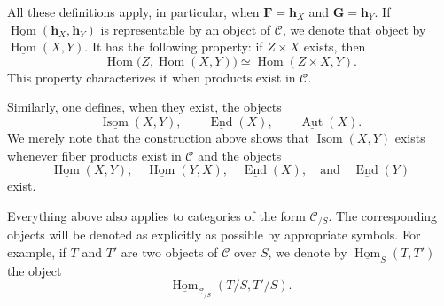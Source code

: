 All these definitions apply, in particular, when
\(\mathbf F=\mathbf h_X\) and \(\mathbf G=\mathbf h_Y\). If
\(\underline{\operatorname{Hom}}(\mathbf h_X,\mathbf h_Y)\) is
representable by an object of \(\mathscr C\), we denote that object by
\(\underline{\operatorname{Hom}}(X,Y)\). It has the following property:
if \(Z\times X\) exists, then
\[
  \operatorname{Hom}
    \bigl(Z,\underline{\operatorname{Hom}}(X,Y)\bigr)
    \simeq
  \operatorname{Hom}(Z\times X,Y).
\]
This property characterizes it when products exist in \(\mathscr C\).

Similarly, one defines, when they exist, the objects
\[
  \underline{\operatorname{Isom}}(X,Y),
  \qquad
  \underline{\operatorname{End}}(X),
  \qquad
  \underline{\operatorname{Aut}}(X).
\]
We merely note that the construction above shows that
\(\underline{\operatorname{Isom}}(X,Y)\) exists whenever fiber products
exist in \(\mathscr C\) and the objects
\[
  \underline{\operatorname{Hom}}(X,Y),
  \quad
  \underline{\operatorname{Hom}}(Y,X),
  \quad
  \underline{\operatorname{End}}(X),
  \quad\text{and}\quad
  \underline{\operatorname{End}}(Y)
\]
exist.

Everything above also applies to categories of the form \(\mathscr C_{/S}\).
The corresponding objects will be denoted as explicitly as possible by
appropriate symbols. For example, if \(T\) and \(T'\) are two objects of
\(\mathscr C\) over \(S\), we denote by
\(\underline{\operatorname{Hom}}_S(T,T')\) the object
\[
  \underline{\operatorname{Hom}}_{\mathscr C_{/S}}(T/S,T'/S).
\]

